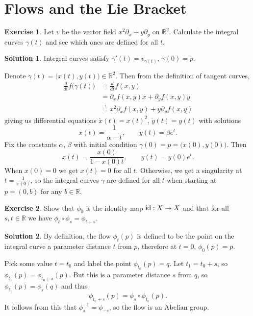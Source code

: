 \documentclass[11pt, a4paper]{report}
\theoremstyle{definition}
\newtheorem{exercise}{Exercise}[part]
\newtheorem{solution}{Solution}[part]
\newenvironment{ex}{\begin{exercise}}{\end{exercise}\pagebreak[1]}
\newenvironment{sol}{\begin{solution}}{\end{solution}\pagebreak[3]}
\newcommand*{\id}{\ensuremath\mathop{}\mathopen{}\mathrm{id}}
\begin{document}
\section{Flows and the Lie Bracket}\label{sec:flowsandtheliebracket}

\begin{ex}

Let $v$ be the vector field $x^2 \partial_x + y \partial_y$ on $\mathbb{R}^2$. Calculate the integral curves $\gamma(t)$ and see which ones are defined for all $t$.

\end{ex}

\begin{sol}

Integral curves satisfy $\gamma'(t) = v_{\gamma(t)}$, $\gamma(0) = p$.

Denote $\gamma(t) = \bigl(x(t), y(t) \bigr) \in \mathbb{R}^2$. Then from the definition of tangent curves,
\begin{align*}
    \frac{d}{dt} f \bigl(\gamma(t) \bigr) &= \frac{d}{dt} f(x, y) \\
        &= \partial_x f(x, y) \dot{x} + \partial_y f(x, y) \dot{y} \\
        &\overset{!}{=} x^2 \partial_x f(x, y) + y \partial_y f(x, y)
\end{align*}
giving us differential equations $\dot{x}(t) = {x(t)}^2$, $\dot{y}(t) = y(t)$ with solutions
\[
    x(t) = \frac{1}{\alpha - t}, \qquad
    y(t) = \beta e^t.
\]
Fix the constants $\alpha$, $\beta$ with initial condition $\gamma(0) = p = \bigl( x(0), y(0) \bigr)$. Then
\[
    x(t) = \frac{x(0)}{1 - x(0)t}, \qquad
    y(t) = y(0) e^t.
\]
When $x(0) = 0$ we get $x(t) = 0$ for all $t$. Otherwise, we get a singularity at $t = \frac{1}{x(0)}$, so the integral curves $\gamma$ are defined for all $t$ when starting at $p = (0, b)$ for any $b \in \mathbb{R}$.

\end{sol}

\begin{ex}

Show that $\phi_0$ is the identity map $\id: X \to X$ and that for all $s, t \in \mathbb{R}$ we have $\phi_t \circ \phi_s = \phi_{t + s}$.

\end{ex}

\begin{sol}

By definition, the flow $\phi_t(p)$ is defined to be the point on the integral curve a parameter distance $t$ from $p$, therefore at $t = 0$, $\phi_0(p) = p$.

Pick some value $t = t_0$ and label the point $\phi_{t_0}(p) = q$. Let $t_1 = t_0 + s$, so $\phi_{t_1}(p) = \phi_{t_0 + s}(p)$. But this is a parameter distance $s$ from $q$, so $\phi_{t_1}(p) = \phi_s(q)$ and thus
\[
    \phi_{t_0 + s}(p) = \phi_s \circ \phi_{t_0}(p).
\]
It follows from this that $\phi_s^{-1} = \phi_{-s}$, so the flow is an Abelian group.

\end{sol}
\end{document}

